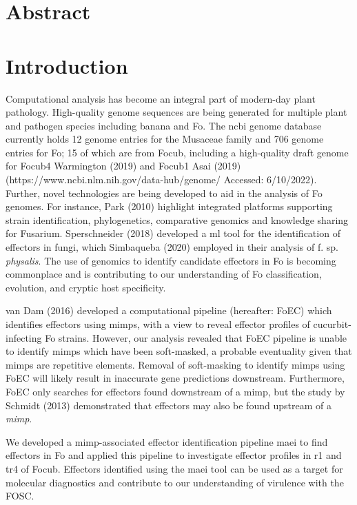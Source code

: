 \section{Abstract}

\newpage
\section{Introduction}

Computational analysis has become an integral part of modern-day plant pathology. High-quality genome sequences are being generated for multiple plant and pathogen species including banana and \ac{Fo}. The \ac{ncbi} genome database currently holds 12 genome entries for the Musaceae family and 706 genome entries for \ac{Fo}; 15 of which are from \ac{Focub}, including a high-quality draft genome for \ac{Focub4} Warmington \et (2019) and \ac{Focub1} Asai \et (2019) (https://www.ncbi.nlm.nih.gov/data-hub/genome/ Accessed: 6/10/2022).  Further, novel technologies are being developed to aid in the analysis of \ac{Fo} genomes. For instance, Park \et (2010) highlight integrated platforms supporting strain identification, phylogenetics, comparative genomics and knowledge sharing for Fusarium. Sperschneider \et (2018) developed a \ac{ml} tool for the identification of effectors in fungi, which Simbaqueba \et (2020) employed in their analysis of \Fo f. sp. \textit{physalis}. The use of genomics to identify candidate effectors in \ac{Fo} is becoming commonplace and is contributing to our understanding of \ac{Fo} classification, evolution, and cryptic host specificity.

van Dam \et  (2016) developed a computational pipeline (hereafter: FoEC) which identifies effectors using \ac{mimp}s, with a view to reveal effector profiles of cucurbit-infecting \ac{Fo} strains. However, our analysis revealed that FoEC pipeline is unable to identify \ac{mimp}s which have been soft-masked, a probable eventuality given that \ac{mimp}s are repetitive elements. Removal of soft-masking to identify \ac{mimp}s using FoEC will likely result in inaccurate gene predictions downstream. Furthermore, FoEC only searches for effectors found downstream of a \ac{mimp}, but the study by Schmidt \et (2013) demonstrated that effectors may also be found upstream of a \textit{mimp}. 

We developed a \ac{mimp}-associated effector identification pipeline \ac{maei} to find effectors in \ac{Fo} and applied this pipeline to investigate effector profiles in \ac{r1} and \ac{tr4} of \ac{Focub}. Effectors identified using the \ac{maei} tool can be used as a target for molecular diagnostics and contribute to our understanding of virulence with the \ac{FOSC}. 


